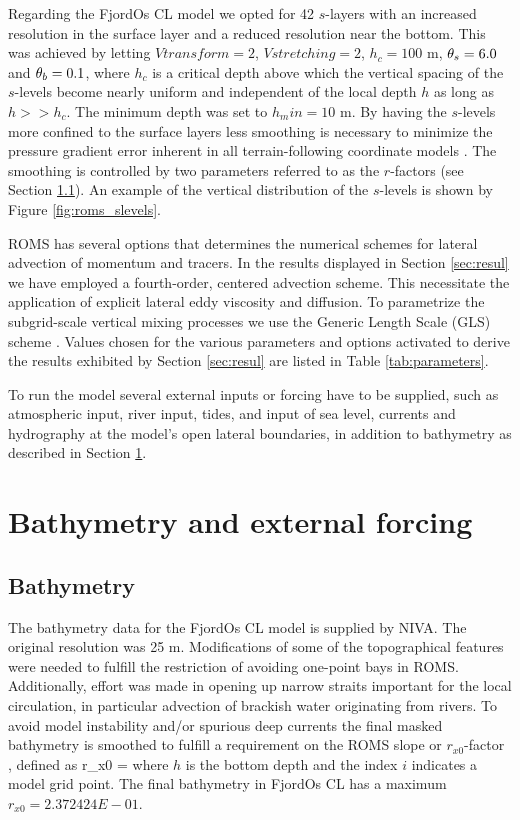 Regarding the FjordOs CL model we opted for 42 $s$-layers with an increased resolution in the surface layer and a reduced resolution near the bottom. This was achieved by letting $Vtransform=2$, $Vstretching=2$, $h_c = 100$ m, $\theta_s = 6.0$ and $\theta_b = 0.1$, where $h_c$ is a critical depth above which the vertical spacing of the $s$-levels become nearly uniform and independent of the local depth $h$ as long as $h >> h_c$. The minimum depth was set to $h_min=10$ m. By having the $s$-levels more confined to the surface layers less smoothing is necessary to minimize the pressure gradient error inherent in all terrain-following coordinate models \citep{haney:1991}. The smoothing is controlled by two parameters referred to as the $r$-factors (see Section \ref{subsec:bathy}). An example of the vertical distribution of the $s$-levels is shown by Figure \ref{fig:roms_slevels}.


ROMS has several options that determines the numerical schemes for lateral advection of momentum and tracers. In the results displayed in Section \ref{sec:resul} we have employed a fourth-order, centered advection scheme. This necessitate the application of explicit lateral eddy viscosity and diffusion. To parametrize the subgrid-scale vertical mixing processes we use the Generic Length Scale (GLS) scheme  \citep{umlau:burch:2003}. Values chosen for the various parameters and options activated to derive the results exhibited by Section \ref{sec:resul} are listed in Table \ref{tab:parameters}. 

To run the model several external inputs or forcing have to be supplied, such as atmospheric input, river input, tides, and input of sea level, currents and hydrography at the model's open lateral boundaries, in addition to bathymetry as described in Section \ref{sec:forcing}.   


\section{Bathymetry and external forcing}
\label{sec:forcing}
\subsection{Bathymetry}
\label{subsec:bathy}
The bathymetry data for the FjordOs CL model is supplied by NIVA. The original resolution was 25 m. Modifications of some of the topographical features were needed to fulfill the restriction of avoiding one-point bays in ROMS. Additionally, effort was made in opening up narrow straits important for the local circulation, in particular advection of brackish water originating from rivers. To avoid model instability and/or spurious deep currents the final masked bathymetry is smoothed to fulfill a requirement on the ROMS slope or $r_{x0}$-factor \citep{beckm:haidv:1993}, defined as
\be
 r_{x0} = 
\ee
where $h$ is the bottom depth and the index $i$ indicates a model grid point. The final bathymetry in FjordOs CL has a maximum $r_{x0} = 2.372424E-01$.

